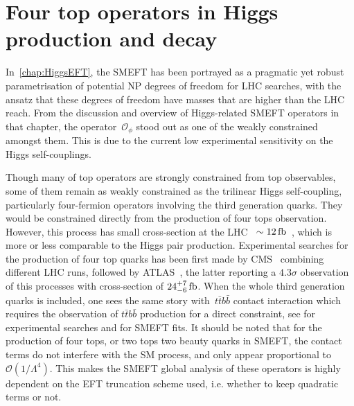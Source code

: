 

\chapter{ Four top operators in Higgs production and decay}\label{chap:4topSingleHiggs}
%
\par In~\autoref{chap:HiggsEFT}, the SMEFT has been portrayed as a pragmatic yet robust parametrisation of potential NP degrees of freedom for LHC searches, with the ansatz that these degrees of freedom have masses that are higher than the LHC reach. From the discussion and overview of Higgs-related SMEFT operators in that chapter, the operator~$ \mathcal O _{\phi}$ stood out as one of the weakly constrained amongst them. This is due to the current low experimental sensitivity on the Higgs self-couplings.
\par 
 Though many of top operators are strongly constrained from top observables, some of them remain as weakly constrained as the trilinear Higgs self-coupling, particularly four-fermion operators involving the third generation quarks. They would be constrained directly from the production of four tops observation. However, this process has small cross-section at the LHC~ $\sim12\, \femtobarn$~\cite{Frederix:2017wme}, which is more or less comparable to the Higgs pair production. Experimental searches for the production of four top quarks has been first made by CMS~\cite{Sirunyan:2019nxl} combining different LHC runs, followed by ATLAS~\cite{Aad:2020klt}, the latter reporting a $4.3 \sigma$ observation of this processes with cross-section of $24^{+7}_{-6}\,\femtobarn$. When the whole third generation quarks is included, one sees the same story with~$t\bar{t}b\bar{b}$ contact interaction which requires the observation of $t\bar{t}b\bar{b}$ production for a direct constraint, see \cite{Sirunyan:2020kgar, ATLAS:2018gug} for experimental searches and \cite{DHondt:2018cww, Hartland:2019bjb} for SMEFT fits. It should be noted that for the production of four tops, or two tops two beauty quarks in SMEFT, the contact terms do not interfere with the SM process, and only appear proportional to $\mathcal{O}(1/\Lambda^4)$. This makes the SMEFT global analysis of these operators is highly dependent on the EFT truncation scheme used, i.e. whether to keep quadratic terms or not. 
